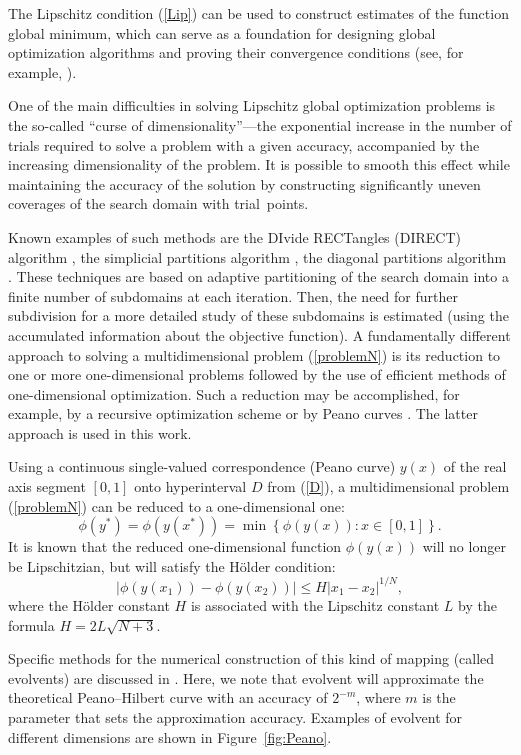 \documentclass[mathematics,article,accept,pdftex,moreauthors]{Definitions/mdpi}
\begin{document}
	The Lipschitz condition (\ref{Lip}) can be used to construct estimates of the function global minimum, which can serve as a foundation for designing global optimization algorithms and proving their convergence conditions (see, for example, \cite{Strongin2000}).
	
	One of the main difficulties in solving Lipschitz global optimization problems is the so-called ``curse of dimensionality''---the exponential increase in the number of trials required to solve a problem with a given accuracy, accompanied by the increasing dimensionality of the problem. It is possible to smooth this effect while maintaining the accuracy of the solution by constructing significantly uneven coverages of the search domain with trial~points.
	
	Known examples of such methods are the DIvide RECTangles (DIRECT) algorithm \cite{Jones1993}, the simplicial partitions algorithm \cite{PaulaviciusZilinskas2014}, the diagonal partitions algorithm \cite{Sergeyev2017}. These techniques are based on adaptive partitioning of the search domain into a finite number of subdomains at each iteration.
	Then, the need for further subdivision for a more detailed study of these subdomains is estimated (using the accumulated information about the objective function). 
	A fundamentally different approach to solving a multidimensional problem (\ref{problemN}) is its reduction to one or more one-dimensional problems followed by the use of efficient methods of one-dimensional optimization. Such a reduction may be accomplished, for example, by a recursive optimization scheme \cite{Grishagin2018} or by Peano curves \cite{Sergeyev2013}. The latter approach is used in this work.
	
	Using a continuous single-valued correspondence (Peano curve) $y(x)$ of the real axis segment $[0,1]$ onto hyperinterval $D$ from (\ref{D}), a multidimensional problem (\ref{problemN}) can be reduced to a one-dimensional one:
	\[
	\phi(y^\ast)=\phi(y(x^\ast))=\min{\left\{\phi(y(x)): x\in[0,1]\right\}}.
	\]
	It is known \cite{Strongin2000, Sergeyev2013} that the reduced one-dimensional function $\phi(y(x))$ will no longer be Lipschitzian, but will satisfy the H{\"o}lder condition:
	\[
	\left|\phi(y(x_1))-\phi(y(x_2))\right|\leq H\left|x_1-x_2\right|^{1/N},
	\]
	where the H{\"o}lder constant $H$ is associated with the Lipschitz constant $L$ by the formula $ H=2 L \sqrt{N+3}$.
	
	Specific methods for the numerical construction of this kind of mapping (called evolvents) are discussed in \cite{Strongin2000,Sergeyev2013}.
	Here, we note that evolvent will approximate the theoretical Peano--Hilbert curve with an accuracy of $2^{-m}$, where $m$ is the parameter that sets the approximation accuracy. Examples of evolvent for different dimensions are shown in Figure~\ref{fig:Peano}.
	
\end{document}
